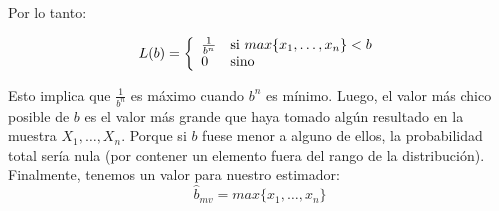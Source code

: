 Por lo tanto:

\begin{center}
\begin{displaymath}
L(b) = \left\{
\begin{array}{l l}
			\frac{1}{b^n} & \text{si }max\{x_{1}, \dots, x_{n}\} < b\\
			0 & \text{sino}
\end{array}
\right.
\end{displaymath}
\end{center}

Esto implica que $\frac{1}{b^n}$ es máximo cuando $b^n$ es mínimo. Luego, el valor más chico posible de $b$ es el valor más grande que haya tomado algún resultado en la muestra $X_{1}, \dots, X_{n}$. Porque si $b$ fuese menor a alguno de ellos, la probabilidad total sería nula (por contener un elemento fuera del rango de la distribución). Finalmente, tenemos un valor para nuestro estimador:
$$\hat{b}_{mv} = max\{x_{1}, \dots, x_{n}\}$$
